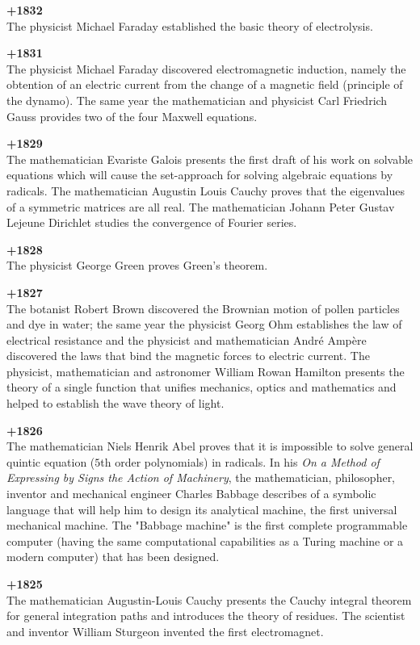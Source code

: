 \textbf{+1832}\\
The physicist Michael Faraday established the basic theory of electrolysis.

\textbf{+1831}\\
The physicist Michael Faraday discovered electromagnetic induction, namely the obtention of an electric current from the change of a magnetic field (principle of the dynamo). The same year the mathematician and physicist Carl Friedrich Gauss provides two of the four Maxwell equations.

\textbf{+1829}\\
The mathematician Evariste Galois presents the first draft of his work on solvable equations which will cause the set-approach for solving algebraic equations by radicals. The mathematician Augustin Louis Cauchy proves that the eigenvalues of a symmetric matrices are all real. The mathematician Johann Peter Gustav Lejeune Dirichlet studies the convergence of Fourier series.

\textbf{+1828}\\
The physicist George Green proves Green's theorem.

\textbf{+1827}\\
The botanist Robert Brown discovered the Brownian motion of pollen particles and dye in water; the same year the physicist Georg Ohm establishes the law of electrical resistance and the physicist and mathematician André Ampère discovered the laws that bind the magnetic forces to electric current. The physicist, mathematician and astronomer William Rowan Hamilton presents the theory of a single function that unifies mechanics, optics and mathematics and helped to establish the wave theory of light.

\textbf{+1826}\\
The mathematician Niels Henrik Abel proves that it is impossible to solve general quintic equation ($5$th order polynomials) in radicals. In his \textit{On a Method of Expressing by Signs the Action of Machinery}, the mathematician, philosopher, inventor and mechanical engineer Charles Babbage describes of a symbolic language that will help him to design its analytical machine, the first universal mechanical machine. The "Babbage machine" is the first complete programmable computer (having the same computational capabilities as a Turing machine or a modern computer) that has been designed. 

\textbf{+1825}\\
The mathematician Augustin-Louis Cauchy presents the Cauchy integral theorem for general integration paths and introduces the theory of residues. The scientist and inventor William Sturgeon invented the first electromagnet.

